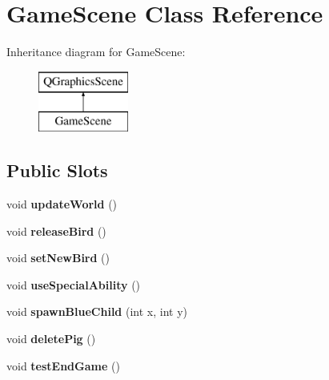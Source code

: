 \hypertarget{classGameScene}{}\section{Game\+Scene Class Reference}
\label{classGameScene}
Inheritance diagram for Game\+Scene\+:\begin{figure}[H]
\begin{center}
\leavevmode
\includegraphics[height=2.000000cm]{classGameScene}
\end{center}
\end{figure}
\subsection*{Public Slots}
\begin{DoxyCompactItemize}
\item 
void {\bfseries update\+World} ()\hypertarget{classGameScene_a3cd26f3187b16c051adfc3d793a779fe}{}\label{classGameScene_a3cd26f3187b16c051adfc3d793a779fe}

\item 
void {\bfseries release\+Bird} ()\hypertarget{classGameScene_a8f3287bb12c938b3136277ee4a85535a}{}\label{classGameScene_a8f3287bb12c938b3136277ee4a85535a}

\item 
void {\bfseries set\+New\+Bird} ()\hypertarget{classGameScene_a37a1d18f300ea8d1c2cd8f317b3494e4}{}\label{classGameScene_a37a1d18f300ea8d1c2cd8f317b3494e4}

\item 
void {\bfseries use\+Special\+Ability} ()\hypertarget{classGameScene_afd5205ce0002a5ede28191c85ac2609c}{}\label{classGameScene_afd5205ce0002a5ede28191c85ac2609c}

\item 
void {\bfseries spawn\+Blue\+Child} (int x, int y)\hypertarget{classGameScene_a8c227f4c754e4ecaf5ffeee55cd5cf3d}{}\label{classGameScene_a8c227f4c754e4ecaf5ffeee55cd5cf3d}

\item 
void {\bfseries delete\+Pig} ()\hypertarget{classGameScene_afb7e34be8e0924d8a201533a85953772}{}\label{classGameScene_afb7e34be8e0924d8a201533a85953772}

\item 
void {\bfseries test\+End\+Game} ()\hypertarget{classGameScene_a00aec73ec8bce50ec8901dd56e32d0a5}{}\label{classGameScene_a00aec73ec8bce50ec8901dd56e32d0a5}

\end{DoxyCompactItemize}
